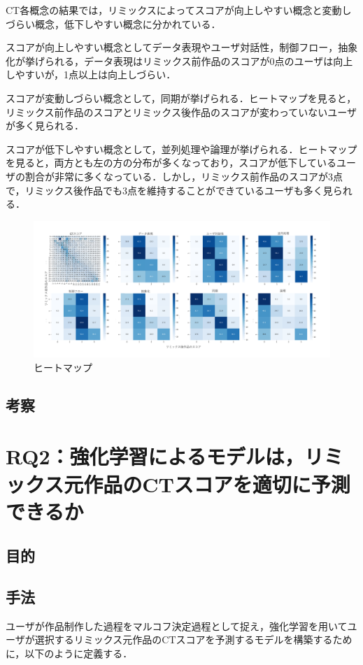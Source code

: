\documentclass[submit,techrep,noauthor]{ipsj}
\begin{document}
CT各概念の結果では，リミックスによってスコアが向上しやすい概念と変動しづらい概念，低下しやすい概念に分かれている．

スコアが向上しやすい概念としてデータ表現やユーザ対話性，制御フロー，抽象化が挙げられる，データ表現はリミックス前作品のスコアが0点のユーザは向上しやすいが，1点以上は向上しづらい．

スコアが変動しづらい概念として，同期が挙げられる．ヒートマップを見ると，リミックス前作品のスコアとリミックス後作品のスコアが変わっていないユーザが多く見られる．

スコアが低下しやすい概念として，並列処理や論理が挙げられる．ヒートマップを見ると，両方とも左の方の分布が多くなっており，スコアが低下しているユーザの割合が非常に多くなっている．しかし，リミックス前作品のスコアが3点で，リミックス後作品でも3点を維持することができているユーザも多く見られる．

\begin{figure}[t]
  \centering
  \includegraphics[width=\textwidth]{@IPSJ_SIGSE202511_Horio/heatmap.pdf}
  \caption{ヒートマップ}
  \label{heatmap}
\end{figure}

\subsection{考察}



\section{RQ2：強化学習によるモデルは，リミックス元作品のCTスコアを適切に予測できるか}
\subsection{目的}

\subsection{手法}
ユーザが作品制作した過程をマルコフ決定過程として捉え，強化学習を用いてユーザが選択するリミックス元作品のCTスコアを予測するモデルを構築するために，以下のように定義する．
\end{document}
